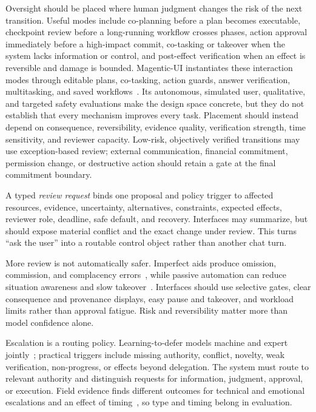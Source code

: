 Oversight should be placed where human judgment changes the risk of the next transition. Useful modes include co-planning before a plan becomes executable, checkpoint review before a long-running workflow crosses phases, action approval immediately before a high-impact commit, co-tasking or takeover when the system lacks information or control, and post-effect verification when an effect is reversible and damage is bounded. Magentic-UI instantiates these interaction modes through editable plans, co-tasking, action guards, answer verification, multitasking, and saved workflows~\cite{mozannar2025magenticui}. Its autonomous, simulated user, qualitative, and targeted safety evaluations make the design space concrete, but they do not establish that every mechanism improves every task. Placement should instead depend on consequence, reversibility, evidence quality, verification strength, time sensitivity, and reviewer capacity. Low-risk, objectively verified transitions may use exception-based review; external communication, financial commitment, permission change, or destructive action should retain a gate at the final commitment boundary.

A typed \emph{review request} binds one proposal and policy trigger to affected resources, evidence, uncertainty, alternatives, constraints, expected effects, reviewer role, deadline, safe default, and recovery. Interfaces may summarize, but should expose material conflict and the exact change under review. This turns ``ask the user'' into a routable control object rather than another chat turn.

More review is not automatically safer. Imperfect aids produce omission, commission, and complacency errors~\cite{parasuraman2010complacency}, while passive automation can reduce situation awareness and slow takeover~\cite{endsley1995outoftheloop}. Interfaces should use selective gates, clear consequence and provenance displays, easy pause and takeover, and workload limits rather than approval fatigue. Risk and reversibility matter more than model confidence alone.

Escalation is a routing policy. Learning-to-defer models machine and expert jointly~\cite{mozannar2020defer}; practical triggers include missing authority, conflict, novelty, weak verification, non-progress, or effects beyond delegation. The system must route to relevant authority and distinguish requests for information, judgment, approval, or execution. Field evidence finds different outcomes for technical and emotional escalations and an effect of timing~\cite{wang2026agentichitl}, so type and timing belong in evaluation.

